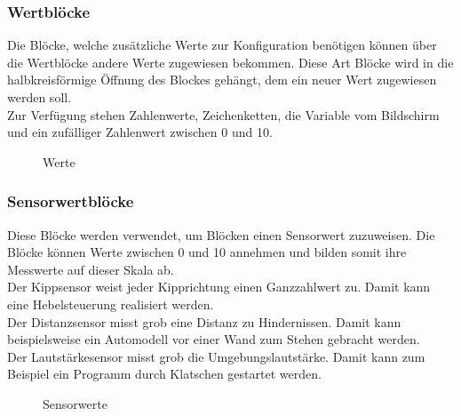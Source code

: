 \subsubsection{Wertblöcke}

Die Blöcke, welche zusätzliche Werte zur Konfiguration benötigen können über die Wertblöcke andere Werte zugewiesen bekommen. Diese Art Blöcke wird in die halbkreisförmige Öffnung des Blockes gehängt, dem ein neuer Wert zugewiesen werden soll. \\
Zur Verfügung stehen Zahlenwerte, Zeichenketten, die Variable vom Bildschirm und ein zufälliger Zahlenwert zwischen 0 und 10.

\begin{figure}[htbp!]
	\centering
	\caption[Werte]{Werte}
	\label{img:Werte}
\end{figure}


\subsubsection{Sensorwertblöcke}

Diese Blöcke werden verwendet, um Blöcken einen Sensorwert zuzuweisen. Die Blöcke können Werte zwischen 0 und 10 annehmen und bilden somit ihre Messwerte auf dieser Skala ab.\\
Der Kippsensor weist jeder Kipprichtung einen Ganzzahlwert zu. Damit kann eine Hebelsteuerung realisiert werden. \\
Der Distanzsensor misst grob eine Distanz zu Hindernissen. Damit kann beispielsweise ein Automodell vor einer Wand zum Stehen gebracht werden.\\
Der Lautstärkesensor misst grob die Umgebungslautstärke. Damit kann zum Beispiel ein Programm durch Klatschen gestartet werden.

\begin{figure}[H]
	\centering
	\caption[Sensorwerte]{Sensorwerte} %
	\label{img:Sensorwerte}
\end{figure}



